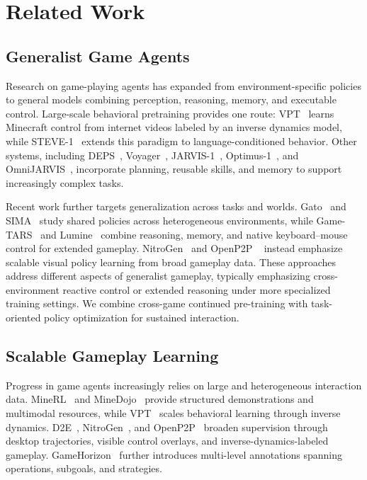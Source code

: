 


\section{Related Work}

\subsection{Generalist Game Agents}

Research on game-playing agents has expanded from environment-specific policies to general models combining perception, reasoning, memory, and executable control. Large-scale behavioral pretraining provides one route: VPT~\cite{baker2022vpt} learns Minecraft control from internet videos labeled by an inverse dynamics model, while STEVE-1~\cite{lifshitz2023steve1} extends this paradigm to language-conditioned behavior. Other systems, including DEPS~\cite{wang2023deps}, Voyager~\cite{wang2023voyager}, JARVIS-1~\cite{wang2025jarvis1}, Optimus-1~\cite{li2024optimus1}, and OmniJARVIS~\cite{wang2024omnijarvis}, incorporate planning, reusable skills, and memory to support increasingly complex tasks. 

Recent work further targets generalization across tasks and worlds. Gato~\cite{reed2022gato} and SIMA~\cite{simateam2024sima} study shared policies across heterogeneous environments, while Game-TARS~\cite{wang2025gametars} and Lumine~\cite{tan2025lumine} combine reasoning, memory, and native keyboard–mouse control for extended gameplay. NitroGen~\cite{magne2026nitrogen} and OpenP2P ~\cite{yue2026openp2p} instead emphasize scalable visual policy learning from broad gameplay data. These approaches address different aspects of generalist gameplay, typically emphasizing cross-environment reactive control or extended reasoning under more specialized training settings. We combine cross-game continued pre-training with task-oriented policy optimization for sustained interaction.

\subsection{Scalable Gameplay Learning}

Progress in game agents increasingly relies on large and heterogeneous interaction data. MineRL~\cite{guss2019minerl} and MineDojo~\cite{fan2022minedojo} provide structured demonstrations and multimodal resources, while VPT~\cite{baker2022vpt} scales behavioral learning through inverse dynamics. D2E~\cite{choi2026d2e}, NitroGen~\cite{magne2026nitrogen}, and OpenP2P~\cite{yue2026openp2p} broaden supervision through desktop trajectories, visible control overlays, and inverse-dynamics-labeled gameplay. GameHorizon~\cite{wang2026gamehorizon} further introduces multi-level annotations spanning operations, subgoals, and strategies. 

